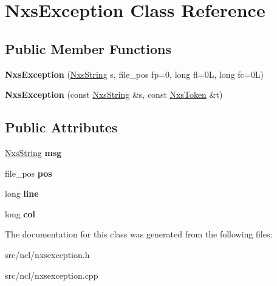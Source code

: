 \hypertarget{classNxsException}{
\section{NxsException Class Reference}
\label{classNxsException}
}
\subsection*{Public Member Functions}
\begin{DoxyCompactItemize}
\item 
\hypertarget{classNxsException_afbde84e7c1c8b01bd30fe1b1e3325d0e}{
{\bfseries NxsException} (\hyperlink{classNxsString}{NxsString} s, file\_\-pos fp=0, long fl=0L, long fc=0L)}
\label{classNxsException_afbde84e7c1c8b01bd30fe1b1e3325d0e}

\item 
\hypertarget{classNxsException_a3fc21e7072c996a1fa1a26413d3c19e7}{
{\bfseries NxsException} (const \hyperlink{classNxsString}{NxsString} \&s, const \hyperlink{classNxsToken}{NxsToken} \&t)}
\label{classNxsException_a3fc21e7072c996a1fa1a26413d3c19e7}

\end{DoxyCompactItemize}
\subsection*{Public Attributes}
\begin{DoxyCompactItemize}
\item 
\hypertarget{classNxsException_a7dba767f41b6231577b2f1d56b006f23}{
\hyperlink{classNxsString}{NxsString} {\bfseries msg}}
\label{classNxsException_a7dba767f41b6231577b2f1d56b006f23}

\item 
\hypertarget{classNxsException_a23a5c45f4ecf444ebdd0c9764df9b326}{
file\_\-pos {\bfseries pos}}
\label{classNxsException_a23a5c45f4ecf444ebdd0c9764df9b326}

\item 
\hypertarget{classNxsException_a4775b1e4ae814d024b1abec1afafeb2c}{
long {\bfseries line}}
\label{classNxsException_a4775b1e4ae814d024b1abec1afafeb2c}

\item 
\hypertarget{classNxsException_a73581aacb676bc6051733d4b53dd2fbc}{
long {\bfseries col}}
\label{classNxsException_a73581aacb676bc6051733d4b53dd2fbc}

\end{DoxyCompactItemize}


The documentation for this class was generated from the following files:\begin{DoxyCompactItemize}
\item 
src/ncl/nxsexception.h\item 
src/ncl/nxsexception.cpp\end{DoxyCompactItemize}
